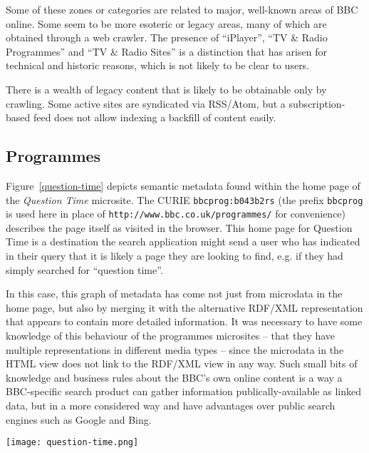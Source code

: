 Some of these zones or categories are related to major, well-known areas of
BBC online. Some seem to be more esoteric or legacy areas, many of which
are obtained through a web crawler. The presence of ``iPlayer'',
``TV \& Radio Programmes'' and ``TV \& Radio Sites'' is a distinction that
has arisen for technical and historic reasons, which is not likely to be
clear to users.

There is a wealth of legacy content that is likely to be obtainable only by
crawling. Some active sites are syndicated via RSS/Atom, but a subscription-based
feed does not allow indexing a backfill of content easily.

\subsection{Programmes}
\label{programmes}

Figure~\ref{question-time} depicts semantic metadata found within the home page
of the \emph{Question Time} microsite. The CURIE\cite{birbeck2009curie}
\texttt{bbcprog:b043b2rs} (the prefix \texttt{bbcprog} is used here in place
of \texttt{http://www.bbc.co.uk/programmes/} for convenience)
describes the page itself as visited in the
browser. This home page for Question Time is a destination the search
application might send a user who has indicated in their query that it
is likely a page they are looking to find, e.g. if they had simply
searched for ``question time''.

In this case, this graph of metadata has come not just from microdata
in the home page, but also by merging it with the alternative RDF/XML
representation that appears to contain more detailed information.
It was necessary to have some knowledge of this behaviour of the
programmes microsites -- that they have multiple representations
in different media types -- since the microdata in the HTML view
does not link to the RDF/XML view in any way. Such small bits of
knowledge and business rules about the BBC's own online content
is a way a BBC-specific search product can gather information publically-available
as linked data, but in a more considered way and have advantages over
public search engines such as Google and Bing.

\begin{sidewaysfigure}
  \begin{center}
    \texttt{[image: question-time.png]}
  \end{center}
  \caption{Semantic metadata found within \emph{Question Time} home page}
  \label{question-time}
\end{sidewaysfigure}

